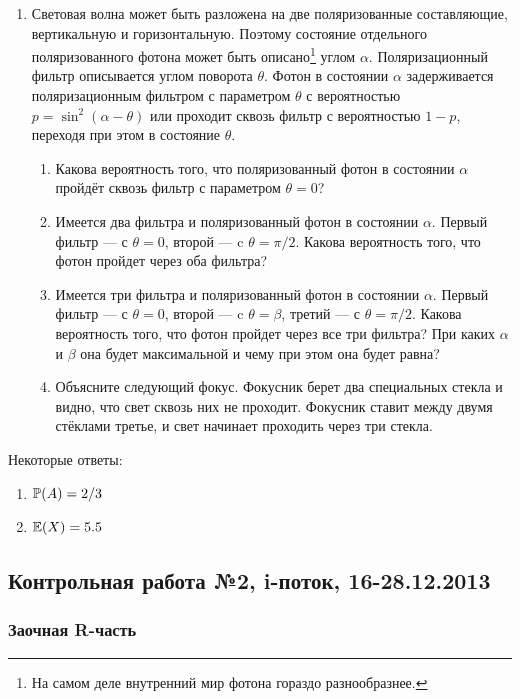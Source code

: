 \documentclass[12pt, a4paper]{article}\usepackage[]{graphicx}\usepackage[]{color}
\begin{document}
\begin{enumerate}
					\item Световая волна может быть разложена на две поляризованные составляющие, вертикальную и горизонтальную. Поэтому состояние отдельного поляризованного фотона может быть описано\footnote{На самом деле внутренний мир фотона гораздо разнообразнее.} углом $\alpha$. Поляризационный фильтр описывается углом поворота $\theta$. Фотон в состоянии $\alpha$ задерживается поляризационным фильтром с параметром $\theta$ с вероятностью $p=\sin^2(\alpha-\theta)$ или проходит сквозь фильтр с вероятностью $1-p$, переходя при этом в состояние $\theta$.

					\begin{enumerate}
						\item Какова вероятность того, что поляризованный фотон в состоянии $\alpha$ пройдёт сквозь фильтр с параметром $\theta=0$?
						\item Имеется два фильтра и поляризованный фотон в состоянии $\alpha$. Первый фильтр — с $\theta=0$, второй — c $\theta=\pi/2$. Какова вероятность того, что фотон пройдет через оба фильтра?
						\item Имеется три фильтра и поляризованный фотон в состоянии $\alpha$. Первый фильтр — с $\theta=0$, второй — c $\theta=\beta$, третий — с $\theta=\pi/2$. Какова вероятность того, что фотон пройдет через все три фильтра? При каких $\alpha$ и $\beta$ она будет максимальной и чему при этом она будет равна?
						\item Объясните следующий фокус. Фокусник берет два специальных стекла и видно, что свет сквозь них не проходит. Фокусник ставит между двумя стёклами третье, и свет начинает проходить через три стекла.
					\end{enumerate}


				\end{enumerate}

				Некоторые ответы:
				\begin{enumerate}
					\item $\P(A)=2/3$
					\item $\E(X)=5.5$
				\end{enumerate}


				\subsection{Контрольная работа №2, i-поток, 16-28.12.2013}

				\subsubsection*{Заочная R-часть}
\end{document}

